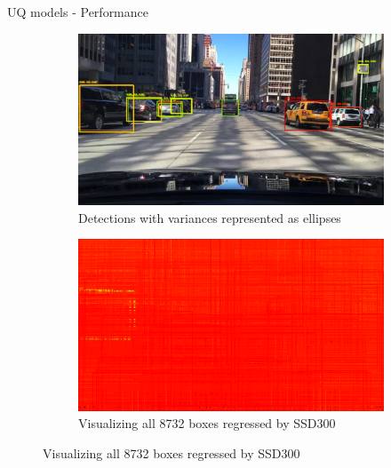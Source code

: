 \documentclass[10pt, aspectratio=169]{beamer}
\begin{document}
\begin{frame}[allowframebreaks]{UQ models - Performance}
    \begin{figure}[H]
        \captionsetup[table]{skip=0pt}
           \centering
           \begin{subfigure}[t]{0.495\textwidth}
               \centering
               \includegraphics[width=\textwidth]{images/det_images/bdd_bnn_variances_1.png}
               \caption{Detections with variances represented as ellipses}
           \end{subfigure}
           \begin{subfigure}[t]{0.495\textwidth}
               \centering
               \includegraphics[width=\textwidth]{images/det_images/all_bnn_bdd_1.png}
               \caption{Visualizing all 8732 boxes regressed by SSD300}
           \end{subfigure}
           

\end{figure}
\end{frame}
\end{document}
